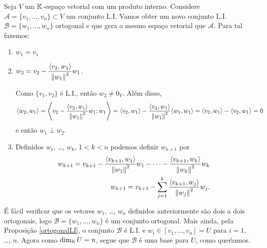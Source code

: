 Seja $V$ um $\mathbb{K}$-espa\c{c}o vetorial com um produto interno. Considere $\mathcal{A} = \{v_1, \dots, v_n\} \subset V$ um conjunto L.I. Vamos obter um novo conjunto L.I. $\mathcal{B} = \{w_1, \dots, w_n\}$ ortogonal e que gera o mesmo espa\c{c}o vetorial que $\mathcal{A}$. Para tal fazemos:
\begin{enumerate}
	\item $w_1 = v_1$
	\item $w_2 = v_2 - \dfrac{\langle v_2, w_1\rangle}{\left\lVert w_1\right\rVert^2}w_1$.

	Como $\{v_1, v_2\}$ \'e L.I., ent\~ao $w_2 \ne 0_V$. Al\'em disso,
	\begin{align*}
		\langle w_2, w_1 \rangle = \left\langle v_2 - \dfrac{\langle v_2, w_1 \rangle}{\left\lVert w_1\right\rVert^2}w_1; w_1 \right\rangle = \langle v_2, w_1\rangle - \dfrac{\langle v_2, w_1\rangle}{\left\lVert w_1\right\rVert^2}\langle w_1, w_1\rangle = \langle v_2, w_1\rangle - \langle v_2, w_1 \rangle = 0
	\end{align*}
	e ent\~ao $w_1 \perp w_2$.
	\item Definidos $w_1$, \dots, $w_k$, $1 < k < n$ podemos definir $w_{k + 1}$ por
	\begin{align*}
		w_{k + 1} = v_{k + 1} - \dfrac{\langle v_{k + 1}, w_1\rangle}{\left\lVert w_1\right\rVert^2}w_1 - \cdots - \dfrac{\langle v_{k + 1}, w_k\rangle}{\left\lVert w_k\right\rVert^2}w_k\\
		w_{k + 1} = v_{k + 1} - \sum_{j = 1}^k\dfrac{\langle v_{k + 1}, w_j\rangle}{\left\lVert w_j\right\rVert^2}w_j.
	\end{align*}
\end{enumerate}

\'E f\'acil verificar que os vetores $w_1$, \dots, $w_n$ definidos anteriormente s\~ao dois a dois ortogonais, logo $\mathcal{B} = \{w_1, \dots, w_n\}$ \'e um conjunto ortogonal. Mais ainda, pela Proposi\c{c}\~ao \ref{ortogonalLI}, o conjunto $\mathcal{B}$ \'e L.I. e $w_i \in [v_1, \dots, v_n] = U$ para $i = 1$, \dots, $n$. Agora como $\dim_{\mathbb{K}} U = n$, segue que $\mathcal{B}$ \'e uma base para $U$, como quer{\'\i}amos.

